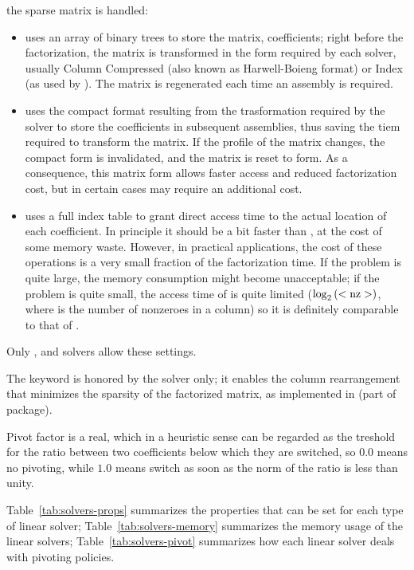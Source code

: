 the sparse matrix is handled:
\begin{itemize}
\item {} uses an array of binary trees to store the matrix,
coefficients; right before the factorization, the matrix is transformed
in the form required by each solver, usually Column Compressed
(also known as Harwell-Boieng format) or Index (as used by ).
The matrix is regenerated each time an assembly is required.
\item {} uses the compact format resulting from the trasformation
required by the solver to store the coefficients in subsequent assemblies,
thus saving the tiem required to transform the matrix.
If the profile of the matrix changes, the compact form is invalidated,
and the matrix is reset to  form.  As a consequence, this matrix
form allows faster access and reduced factorization cost, but in certain
cases may require an additional cost.
\item {} uses a full index table to grant direct access time to
the actual location of each coefficient.
In principle it should be a bit faster than , at the cost
of some memory waste.
However, in practical applications, the cost of these operations
is a very small fraction of the factorization time.
If the problem is quite large, the memory consumption might
become unacceptable; if the problem is quite small, the access time
of  is quite limited ($\log_2\left( \mathrm{<nz>} \right)$, where
 is the number of nonzeroes in a column) so it is definitely
comparable to that of .
\end{itemize}
Only ,  and  solvers allow these
settings.

\noindent
The keyword  is honored by the  solver only;
it enables the column rearrangement that minimizes the sparsity
of the factorized matrix, as implemented in 
(part of  package).

\noindent
Pivot factor is a real, which in a heuristic sense can be regarded as
the treshold for the ratio between two coefficients below which they are
switched, so $ 0.0 $ means no pivoting, while $ 1.0 $ means switch as
soon as the norm of the ratio is less than unity.

\noindent
Table~\ref{tab:solvers-props} summarizes the properties that can be set
for each type of linear solver; Table~\ref{tab:solvers-memory} summarizes 
the memory usage of the linear solvers; Table~\ref{tab:solvers-pivot}
summarizes how each linear solver deals with pivoting policies.

